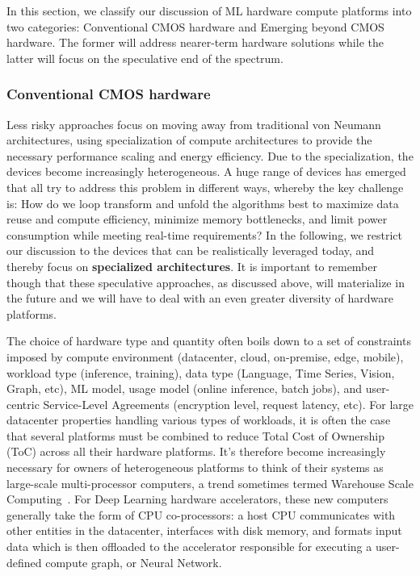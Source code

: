 In this section, we classify our discussion of ML hardware compute platforms into two categories: Conventional CMOS hardware and Emerging beyond CMOS hardware.  The former will address nearer-term hardware solutions while the latter will focus on the speculative end of the spectrum.


\subsubsection{Conventional CMOS hardware}

Less risky approaches focus on moving away from traditional von Neumann architectures, using specialization of compute architectures to provide the necessary performance scaling and energy efficiency. 
Due to the specialization, the devices become increasingly heterogeneous.
A huge range of devices has emerged that all try to address this problem in different ways, whereby the key challenge is:
How do we loop transform and unfold the algorithms best to maximize data reuse and compute efficiency, minimize memory bottlenecks, and limit power consumption while meeting real-time requirements? 
In the following, we restrict our discussion to the devices that can be realistically leveraged today, and thereby focus on \textbf{specialized architectures}. 
It is important to remember though that these speculative approaches, as discussed above, will materialize in the future and we will have to deal with an even greater diversity of hardware platforms.

The choice of hardware type and quantity often boils down to a set of constraints imposed by compute environment (datacenter, cloud, on-premise, edge, mobile), workload type (inference, training), data type (Language, Time Series, Vision, Graph, etc), ML model, usage model (online inference, batch jobs), and user-centric Service-Level Agreements (encryption level, request latency, etc). For large datacenter properties handling various types of workloads, it is often the case that several platforms must be combined to reduce Total Cost of Ownership (ToC) across all their hardware platforms. It's therefore become increasingly necessary for owners of heterogeneous platforms to think of their systems as large-scale multi-processor computers, a trend sometimes termed Warehouse Scale Computing~\cite{wsc}. For Deep Learning hardware accelerators, these new computers generally take the form of CPU co-processors: a host CPU communicates with other entities in the datacenter, interfaces with disk memory, and formats input data which is then offloaded to the accelerator responsible for executing a user-defined compute graph, or Neural Network. 

